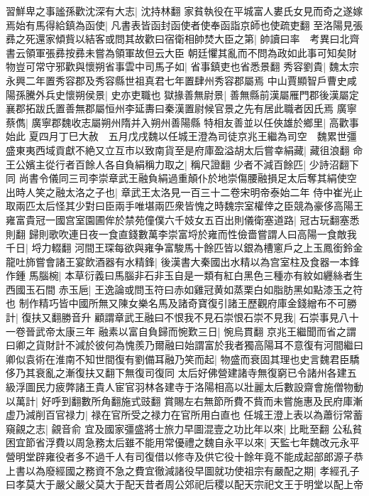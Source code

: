 習鮮卑之事謐孫歡沈深有大志|{
	沈持林翻}
家貧執役在平城富人婁氏女見而奇之遂嫁焉始有馬得給鎮為函使|{
	凡書表皆函封函使者使奉函詣京師也使疏吏翻}
至洛陽見張彞之死還家傾貲以結客或問其故歡曰宿衛相帥焚大臣之第|{
	帥讀曰率　考異曰北齊書云領軍張彞按彞未嘗為領軍故但云大臣}
朝廷懼其亂而不問為政如此事可知矣財物豈可常守邪歡與懷朔省事雲中司馬子如|{
	省事鎮吏也省悉景翻}
秀容劉貴|{
	魏太宗永興二年置秀容郡及秀容縣世祖真君七年置肆州秀容郡屬焉}
中山賈顯智戶曹史咸陽孫騰外兵史懷朔侯景|{
	史亦吏職也}
獄掾善無尉景|{
	善無縣前漢屬雁門郡後漢屬定襄郡拓跋氏置善無郡屬恒州李延夀曰秦漢置尉候官景之先有居此職者因氏焉}
廣寧蔡儁|{
	廣寧郡魏收志屬朔州隋并入朔州善陽縣}
特相友善並以任俠雄於鄉里|{
	高歡事始此}
夏四月丁巳大赦　五月戊戌魏以任城王澄為司徒京兆王繼為司空　魏累世彊盛東夷西域貢獻不絶又立互市以致南貨至是府庫盈溢胡太后嘗幸絹藏|{
	藏徂浪翻}
命王公嬪主從行者百餘人各自負絹稱力取之|{
	稱尺證翻}
少者不減百餘匹|{
	少詩沼翻下同}
尚書令儀同三司李崇章武王融負絹過重顛仆於地崇傷腰融損足太后奪其絹使空出時人笑之融太洛之子也|{
	章武王太洛見一百三十二卷宋明帝泰始二年}
侍中崔光止取兩匹太后怪其少對曰臣兩手唯堪兩匹衆皆愧之時魏宗室權倖之臣競為豪侈高陽王雍富貴冠一國宫室園圃侔於禁苑僮僕六千妓女五百出則儀衛塞道路|{
	冠古玩翻塞悉則翻}
歸則歌吹連日夜一食直錢數萬李崇富埒於雍而性儉嗇嘗謂人曰高陽一食敵我千日|{
	埒力輟翻}
河間王琛每欲與雍争富駿馬十餘匹皆以銀為槽窻戶之上玉鳳銜鈴金龍吐斾嘗會諸王宴飲酒器有水精鋒|{
	後漢書大秦國出水精以為宫室柱及食器一本鋒作鍾}
馬腦椀|{
	本草衍義曰馬腦非石非玉自是一類有紅白黑色三種亦有紋如纒絲者生西國玉石間}
赤玉巵|{
	王逸論或問玉符曰赤如雞冠黄如蒸栗白如脂肪黑如點漆玉之符也}
制作精巧皆中國所無又陳女樂名馬及諸奇寶復引諸王歷觀府庫金錢繒布不可勝計|{
	復扶又翻勝音升}
顧謂章武王融曰不恨我不見石崇恨石崇不見我|{
	石崇事見八十一卷晉武帝太康三年}
融素以富自負歸而惋歎三日|{
	惋烏貫翻}
京兆王繼聞而省之謂曰卿之貨財計不減於彼何為愧羨乃爾融曰始謂富於我者獨高陽耳不意復有河間繼曰卿似袁術在淮南不知世間復有劉備耳融乃笑而起|{
	物盛而衰固其理也史言魏君臣驕侈乃其衰亂之漸復扶又翻下無復司復同}
太后好佛營建諸寺無復窮已令諸州各建五級浮圖民力疲弊諸王貴人宦官羽林各建寺于洛陽相高以壯麗太后數設齋會施僧物動以萬計|{
	好呼到翻數所角翻施式豉翻}
賞賜左右無節所費不貲而未嘗施惠及民府庫漸虚乃減削百官禄力|{
	禄在官所受之禄力在官所用白直也}
任城王澄上表以為蕭衍常蓄窺覦之志|{
	覦音俞}
宜及國家彊盛將士旅力早圖混壹之功比年以來|{
	比毗至翻}
公私貧困宜節省浮費以周急務太后雖不能用常優禮之魏自永平以來|{
	天監七年魏改元永平}
營明堂辟雍役者多不過千人有司復借以修寺及供它役十餘年竟不能成起部郎源子恭上書以為廢經國之務資不急之費宜徹減諸役早圖就功使祖宗有嚴配之期|{
	孝經孔子曰孝莫大于嚴父嚴父莫大于配天昔者周公郊祀后稷以配天宗祀文王于明堂以配上帝}
